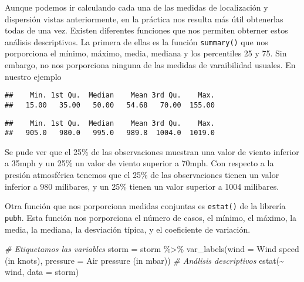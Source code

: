 \documentclass[
]{book}
\newenvironment{Shaded}{\begin{snugshade}}{\end{snugshade}}
\newcommand{\AttributeTok}[1]{\textcolor[rgb]{0.77,0.63,0.00}{#1}}
\newcommand{\CommentTok}[1]{\textcolor[rgb]{0.56,0.35,0.01}{\textit{#1}}}
\newcommand{\FunctionTok}[1]{\textcolor[rgb]{0.00,0.00,0.00}{#1}}
\newcommand{\NormalTok}[1]{#1}
\newcommand{\OtherTok}[1]{\textcolor[rgb]{0.56,0.35,0.01}{#1}}
\newcommand{\SpecialCharTok}[1]{\textcolor[rgb]{0.00,0.00,0.00}{#1}}
\newcommand{\StringTok}[1]{\textcolor[rgb]{0.31,0.60,0.02}{#1}}
\begin{document}
Aunque podemos ir calculando cada una de las medidas de localización y dispersión vistas anteriormente, en la práctica nos resulta más útil obtenerlas todas de una vez. Existen diferentes funciones que nos permiten obterner estos análisis descriptivos. La primera de ellas es la función \texttt{summary()} que nos porporciona el mínimo, máximo, media, mediana y los percentiles 25 y 75. Sin embargo, no nos porporciona ninguna de las medidas de varaibilidad usuales. En nuestro ejemplo

\begin{Shaded}
\end{Shaded}

\begin{verbatim}
##    Min. 1st Qu.  Median    Mean 3rd Qu.    Max. 
##   15.00   35.00   50.00   54.68   70.00  155.00
\end{verbatim}

\begin{Shaded}
\end{Shaded}

\begin{verbatim}
##    Min. 1st Qu.  Median    Mean 3rd Qu.    Max. 
##   905.0   980.0   995.0   989.8  1004.0  1019.0
\end{verbatim}

Se pude ver que el 25\% de las observaciones muestran una valor de viento inferior a 35mph y un 25\% un valor de viento superior a 70mph. Con respecto a la presión atmosférica tenemos que el 25\% de las observaciones tienen un valor inferior a 980 milibares, y un 25\% tienen un valor superior a 1004 milibares.

Otra función que nos porporciona medidas conjuntas es \texttt{estat()} de la librería \texttt{pubh}. Esta función nos porporciona el número de casos, el mínimo, el máximo, la media, la mediana, la desviación típica, y el coeficiente de variación.

\begin{Shaded}
\begin{Highlighting}[]
\CommentTok{\# Etiquetamos las variables}
\NormalTok{storm }\OtherTok{=}\NormalTok{ storm }\SpecialCharTok{\%\textgreater{}\%} 
  \FunctionTok{var\_labels}\NormalTok{(}\AttributeTok{wind =} \StringTok{\textquotesingle{}Wind speed (in knots)\textquotesingle{}}\NormalTok{, }
             \AttributeTok{pressure =} \StringTok{\textquotesingle{}Air pressure (in mbar)\textquotesingle{}}\NormalTok{)}
\CommentTok{\# Análisis descriptivos}
\FunctionTok{estat}\NormalTok{(}\SpecialCharTok{\textasciitilde{}}\NormalTok{ wind, }\AttributeTok{data =}\NormalTok{ storm)}
\end{Highlighting}
\end{Shaded}
\end{document}
